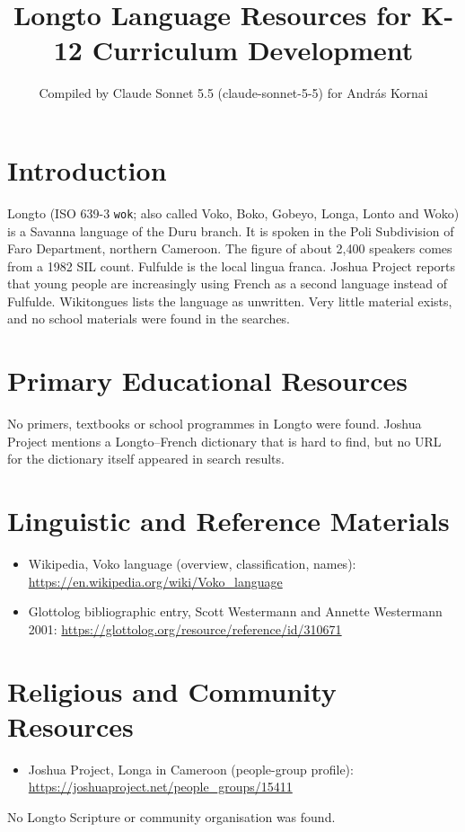 \documentclass[12pt]{article}
\title{Longto Language Resources for K-12 Curriculum Development}
\author{Compiled by Claude Sonnet 5.5 (claude-sonnet-5-5) for Andr\'as Kornai}
\date{}
\begin{document}
\maketitle

\section{Introduction}
Longto (ISO 639-3 \texttt{wok}; also called Voko, Boko, Gobeyo, Longa, Lonto and Woko) is a Savanna language of the Duru branch. It is spoken in the Poli Subdivision of Faro Department, northern Cameroon. The figure of about 2,400 speakers comes from a 1982 SIL count. Fulfulde is the local lingua franca. Joshua Project reports that young people are increasingly using French as a second language instead of Fulfulde. Wikitongues lists the language as unwritten. Very little material exists, and no school materials were found in the searches.

\section{Primary Educational Resources}
No primers, textbooks or school programmes in Longto were found. Joshua Project mentions a Longto--French dictionary that is hard to find, but no URL for the dictionary itself appeared in search results.

\section{Linguistic and Reference Materials}
\begin{itemize}
\item Wikipedia, Voko language (overview, classification, names): \url{https://en.wikipedia.org/wiki/Voko_language}
\item Glottolog bibliographic entry, Scott Westermann and Annette Westermann 2001: \url{https://glottolog.org/resource/reference/id/310671}
\end{itemize}

\section{Religious and Community Resources}
\begin{itemize}
\item Joshua Project, Longa in Cameroon (people-group profile): \url{https://joshuaproject.net/people_groups/15411}
\end{itemize}
No Longto Scripture or community organisation was found.
\end{document}
